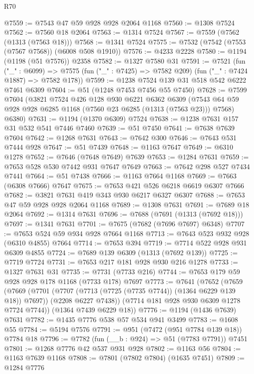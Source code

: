 \begin{lexlean}{R70}
\begin{coremodule}
@7559 := @7543 @47 @59 @928 @928 @2064 @1168
@7560 := @1308 @7524
@7562 := @7560 @18 @2064
@7563 := @1314 @7524
@7567 := @7559 (@7562 (@1313 (@7563 @18)))
@7568 := @1341 @7524
@7575 := @7532 (@7542 (@7553 (@7567 @7568)) (@6008 @508 @1910))
@7576 := @4233 @2228
@7580 := @1194 (@1198 (@51 @7576)) @2358
@7582 := @1327 @7580 @31
@7591 := @7521
    (fun ("_" : @6099) =>
    @7575 (fun ("_" : @7425) => @7582 @209) (fun ("_" : @7424 @1887) => @7582 @178))
@7599 := @1238 @7524 @139 @31 @518 @542 @6222 @7461 @6309
@7604 := @51 (@1248 @7453 @7456 @55 @7450)
@7628 := @7599
    @7604
    (@3821
      @7524
      @426
      @128
      @930
      @6221
      @6362
      @6309
      (@7543 @64 @59 @928 @928 @6285 @1168 (@7560 @23 @6285 (@1313 (@7563 @23))) @7568)
      @6380)
@7631 := @1194 (@1370 @6309) @7524
@7638 := @1238 @7631 @157 @31 @532 @541 @7446 @7460
@7639 := @51 @7450
@7641 := @7638 @7639 @7604
@7642 := @1268 @7631
@7643 := @7642 @300
@7646 := @7643 @531 @7444 @928
@7647 := @51 @7439
@7648 := @1163 @7647
@7649 := @6310 @1278
@7652 := @7646 (@7648 @7649) @7639
@7653 := @1284 @7631
@7659 := @7653 @528 @530 @7442 @931 @7647 @7649
@7663 := @7642 @298 @527 @7434 @7441
@7664 := @51 @7438
@7666 := @1163 @7664 @1168
@7669 := @7663 (@6308 @7666) @7647
@7675 := @7653 @421 @526 @6218 @6619 @6307 @7666
@7682 := @3821 @7631 @419 @343 @930 @6217 @6327 @6307
@7688 := @7653 @47 @59 @928 @928 @2064 @1168
@7689 := @1308 @7631
@7691 := @7689 @18 @2064
@7692 := @1314 @7631
@7696 := @7688 (@7691 (@1313 (@7692 @18)))
@7697 := @1341 @7631
@7701 := @7675 (@7682 (@7696 @7697) @6348)
@7707 := @7653 @524 @59 @934 @928 @7664 @1168
@7713 := @7643 @523 @932 @928 (@6310 @4855) @7664
@7714 := @7653 @394
@7719 := @7714 @522 @928 @931 @6309 @4855
@7724 := @7689 @139 @6309 (@1313 (@7692 @139))
@7725 := @7719 @7724
@7731 := @7653 @217 @181 @928 @930 @216 @1278
@7733 := @1327 @7631 @31
@7735 := @7731 (@7733 @216)
@7744 := @7653 @179 @59 @928 @928 @178 @1168 (@7733 @178) @7697
@7773 := @7641
    (@7652
      (@7659
        (@7669
          (@7701 (@7707 (@7713 (@7725 (@7735 @7744)) (@1364 @6229 @139 @18)) @7697))
          (@2208 @6227 @7438))
        (@7714 @181 @928 @930 @6309 @1278 @7724 @7744))
      (@1364 @7439 @6229 @18))
@7776 := @1194 (@1436 @7639) @7631
@7782 := @1435 @7776 @538 @57 @534 @941 @3499
@7783 := @1608 @55
@7784 := @5194 @7576
@7791 := @951 (@7472 (@951 @7784 @139 @18)) @7784 @18
@7796 := @7782 (fun (__b : @924) => @51 (@7783 @7791)) @7451
@7801 := @1268 @7776 @42 @537 @931 @928
@7802 := @1163 @56
@7804 := @1163 @7639 @1168
@7808 := @7801 (@7802 @7804) (@1635 @7451)
@7809 := @1284 @7776

\end{coremodule}
\end{lexlean}

